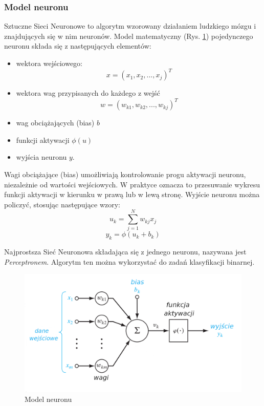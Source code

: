 \subsubsection{Model neuronu}
Sztuczne Sieci Neuronowe to algorytm wzorowany działaniem ludzkiego mózgu 
i znajdujących się w nim neuronów. Model matematyczny (Rys. \ref{neuron}) pojedynczego neuronu składa się z następujących elementów\cite{Omondi2006FPGAIO}:
\begin{itemize}
  \item wektora wejściowego: 
  $$x = (x_1, x_2,...,x_j)^T$$
  \item wektora wag przypisanych do każdego z wejść
  $$w = (w_{k1}, w_{k2},...,w_{kj})^T$$
  \item wag obciążających (bias) $b$
  \item funkcji aktywacji $\phi(u)$ 
  \item wyjścia neuronu $y$. 
\end{itemize}
Wagi obciążające (bias) umożliwiają kontrolowanie progu aktywacji neuronu, niezależnie od wartości wejściowych. W praktyce oznacza to przesuwanie wykresu funkcji aktywacji w kierunku w prawą lub w lewą stronę. Wyjście neuronu można policzyć, stosując następujące wzory:
$$u_k = \sum_{j=1}^{N}{w_{kj}x_j} $$ 
$$y_k = \phi(u_k + b_k) $$ 

Najprostsza Sieć Neuronowa składająca się z jednego neuronu, nazywana jest \emph{Perceptronem}. Algorytm ten można wykorzystać do zadań klasyfikacji binarnej.

\begin{figure}[h]
  \centering
  \includegraphics[width=\textwidth]{img/neuron.png}
  \caption{Model neuronu}
  \label{neuron}
\end{figure}


